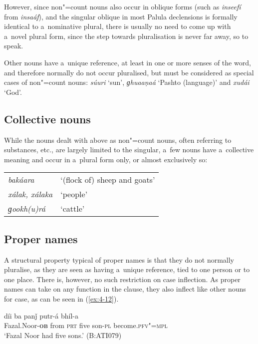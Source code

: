 However, since non"=count nouns also occur in oblique forms (such as \textit{inseefí} from \textit{insaáf}), and the singular oblique in most Palula declensions is formally identical to a~nominative plural, there is usually no need to come up with a~novel plural form, since the step towards pluralisation is never far away, so to speak.


Other nouns have a~unique reference, at least in one or more senses of the word, and therefore normally do not occur pluralised, but must be considered as special cases of non"=count nouns: \textit{súuri} `sun', \textit{ɡhuaaṇaá} `Pashto (language)' and \textit{xudái} `God'.


\subsection{Collective nouns}
\label{subsec:4-4-2}


While the nouns dealt with above as non"=count nouns, often referring to substances, etc., are largely limited to the singular, a~few nouns have a~collective meaning and occur in a~plural form only, or almost exclusively so:



\begin{table}[H]
\begin{tabularx}{\textwidth}{ l@{\hspace{40pt}} Q }
\textit{bakáara} &
`(flock of) sheep and goats'\\
\textit{xálak, xálaka} &
`people'\\
\textit{ɡookh(u)rá} &
`cattle'\\
\end{tabularx}
\end{table}

\subsection{Proper names}
\label{subsec:4-4-3}

A structural property typical of proper names is that they do not normally pluralise, as they are seen as having a~unique reference, tied to one person or to one place. There is, however, no such restriction on case inflection. As proper names can take on any function in the clause, they also inflect like other nouns for case, as can be seen in (\ref{ex:4-12}).

\begin{exe}
\ex
\label{ex:4-12}
\gll [fazelnuur-á] díi ba panǰ putr-á bhíl-a \\
	Fazal.Noor-\textbf{\textsc{ob}} from \textsc{prt} five son-\textsc{pl} become.\textsc{pfv"=mpl} \\
\glt `Fazal Noor had five sons.' (B:ATI079)
\end{exe}

